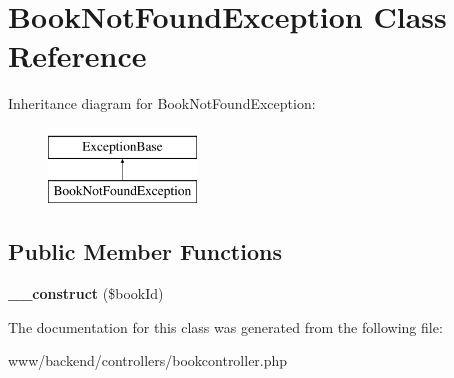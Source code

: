 \hypertarget{classBookNotFoundException}{
\section{BookNotFoundException Class Reference}
\label{classBookNotFoundException}
}
Inheritance diagram for BookNotFoundException:\begin{figure}[H]
\begin{center}
\leavevmode
\includegraphics[height=2.000000cm]{classBookNotFoundException}
\end{center}
\end{figure}
\subsection*{Public Member Functions}
\begin{DoxyCompactItemize}
\item 
\hypertarget{classBookNotFoundException_a201a2ab14afb9d7ff1cd58280738c3ec}{
{\bfseries \_\-\_\-construct} (\$bookId)}
\label{classBookNotFoundException_a201a2ab14afb9d7ff1cd58280738c3ec}

\end{DoxyCompactItemize}


The documentation for this class was generated from the following file:\begin{DoxyCompactItemize}
\item 
www/backend/controllers/bookcontroller.php\end{DoxyCompactItemize}
